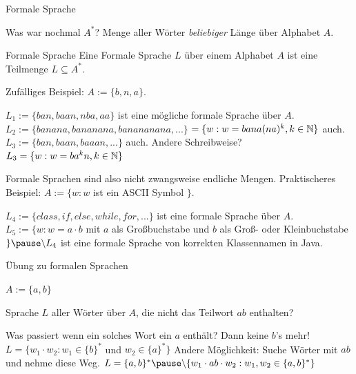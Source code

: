 \begin{frame}{Formale Sprache}
	\begin{itemize}
		\pitem Was war nochmal $A^*$? Menge aller Wörter \emph{beliebiger} Länge über Alphabet $A$.
	\end{itemize}

	\pause
	
	\begin{block}{Formale Sprache}
		Eine Formale Sprache $L$ \pause über einem Alphabet $A$ ist eine Teilmenge $L \subseteq A^*$.
	\end{block}

	\begin{itemize}
		\pitem Zufälliges Beispiel: \pause $A := \{b, n, a\}$.
		\begin{itemize}
			\pitem $L_1 := \{ban, baan, nba, aa\}$ ist eine mögliche formale Sprache über $A$.
			\pitem $L_2 := \{banana, bananana, banananana, ...\}$ \pause $ = \{w : w = bana(na)^k, k \in \mathbb{N}\}$ auch.
			\pitem $L_3 := \{ban, baan, baaan, ...\}$ auch. \pause Andere Schreibweise? \pause \\ $ L_3 = \{w : w = ba^kn, k \in \mathbb{N} \}$
		\end{itemize}
		\pitem Formale Sprachen sind also nicht zwangsweise endliche Mengen.
		\pitem Praktischeres Beispiel: $A := \{w : w $ ist ein ASCII Symbol $\}$.
		\begin{itemize}
			\pitem $L_4 := \{class, if, else, while, for, ...\}$ ist eine formale Sprache über $A$.
			\pitem $L_5 := \{w : w = a \cdot b$ mit $a$ als Großbuchstabe und $b$ als Groß- oder Kleinbuchstabe $ \} \pause \backslash L_4$ \pause ist eine formale Sprache von korrekten Klassennamen in Java.
		\end{itemize}
	\end{itemize}
\end{frame}

\begin{frame}{Übung zu formalen Sprachen}
	\pause
	
	$A := \{a, b\}$
	
	\begin{itemize}
		\pitem Sprache $L$ aller Wörter über $A$, die nicht das Teilwort $ab$ enthalten?
		\begin{itemize}
			\pitem Was passiert wenn ein solches Wort ein $a$ enthält? \pause Dann keine $b$'s mehr!
			\pitem $L = \{w_1 \cdot w_2 : w_1 \in \{b\}^*$ und $w_2 \in \{a\}^* \}$
			\pitem Andere Möglichkeit\pause : Suche Wörter mit $ab$ und nehme diese Weg.
			\pitem $L = \{a, b\}^*\pause \backslash\{ w_1 \cdot ab \cdot w_2 : w_1, w_2 \in \{a,b\}^* \}$
		\end{itemize}
	\end{itemize}
\end{frame}


